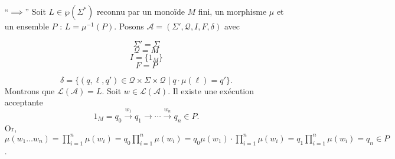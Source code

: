 \begin{prv}
	\begin{itemize}
		\item[``$\implies$''] Soit $L \in \wp(\Sigma^*)$\/ reconnu par un monoïde $M$ fini, un morphisme $\mu$\/ et un ensemble $P$ : $L = \mu^{-1}(P)$. Posons $\mathcal{A} = (\Sigma', \mathcal{Q}, I, F, \delta)$\/ avec

			\vspace{-5mm}
			\begin{multicols}{4}
				\[\Sigma' = \Sigma\]
				\[\mathcal{Q} = M\]
				\[I = \{1_M\}\]
				\[F = P\]
			\end{multicols}
			\vspace{-7mm}\[
				\delta = \{(q,\ell, q') \in \mathcal{Q} \times \Sigma \times \mathcal{Q}  \mid q \cdot \mu(\ell) = q'\}.
			\]
			Montrons que $\mathcal{L}(\mathcal{A}) = L$.
			Soit $w \in \mathcal{L}(\mathcal{A})$. Il existe une exécution acceptante \[
				1_M = q_0 \xrightarrow{w_1} q_1 \to \cdots \xrightarrow{w_n} q_n \in P
			.\] Or, $\mu(w_1\ldots w_n) = \prod_{i=1}^n \mu(w_i) = q_0 \prod_{i=1}^n \mu(w_i) = q_0 \mu(w_1) \cdot \prod_{i=1}^n \mu(w_i) = q_1 \prod_{i=1}^n \mu(w_i) = q_n \in P$.
	\end{itemize}
\end{prv}

